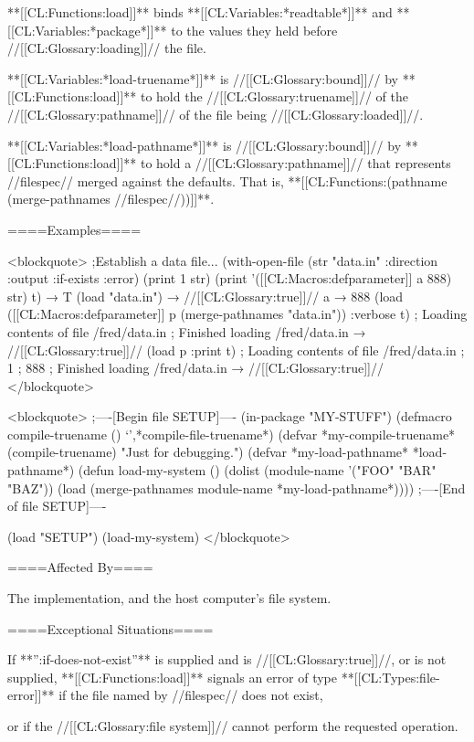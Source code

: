 **[[CL:Functions:load]]** binds **[[CL:Variables:*readtable*]]** and **[[CL:Variables:*package*]]** to the values they held before //[[CL:Glossary:loading]]// the file.


**[[CL:Variables:*load-truename*]]** is //[[CL:Glossary:bound]]// by **[[CL:Functions:load]]** to hold the //[[CL:Glossary:truename]]// of the //[[CL:Glossary:pathname]]// of the file being //[[CL:Glossary:loaded]]//.

**[[CL:Variables:*load-pathname*]]** is //[[CL:Glossary:bound]]// by **[[CL:Functions:load]]** to hold a //[[CL:Glossary:pathname]]// that represents //filespec// merged against the defaults. That is, **[[CL:Functions:(pathname (merge-pathnames //filespec//))]]**.


====Examples====

<blockquote> ;Establish a data file... (with-open-file (str "data.in" :direction :output :if-exists :error) (print 1 str) (print '([[CL:Macros:defparameter]] a 888) str) t) → T (load "data.in") → //[[CL:Glossary:true]]// a → 888 (load ([[CL:Macros:defparameter]] p (merge-pathnames "data.in")) :verbose t) ; Loading contents of file /fred/data.in ; Finished loading /fred/data.in → //[[CL:Glossary:true]]// (load p :print t) ; Loading contents of file /fred/data.in ; 1 ; 888 ; Finished loading /fred/data.in → //[[CL:Glossary:true]]// </blockquote>

\medbreak

<blockquote> ;----[Begin file SETUP]---- (in-package "MY-STUFF") (defmacro compile-truename () `',*compile-file-truename*) (defvar *my-compile-truename* (compile-truename) "Just for debugging.") (defvar *my-load-pathname* *load-pathname*) (defun load-my-system () (dolist (module-name '("FOO" "BAR" "BAZ")) (load (merge-pathnames module-name *my-load-pathname*)))) ;----[End of file SETUP]----


(load "SETUP") (load-my-system) </blockquote>

====Affected By====

The implementation, and the host computer's file system.

====Exceptional Situations====

If **'':if-does-not-exist''** is supplied and is //[[CL:Glossary:true]]//, or is not supplied, **[[CL:Functions:load]]** signals an error of type **[[CL:Types:file-error]]** if the file named by //filespec// does not exist,

or if the //[[CL:Glossary:file system]]// cannot perform the requested operation.

